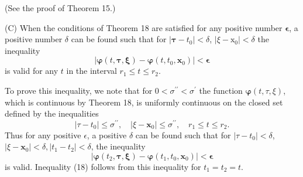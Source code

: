 \documentclass[10pt,a5paper]{book}
\theoremstyle{plain}
\theoremstyle{definition}
\theoremstyle{remark}
\begin{document}
(See the proof of Theorem 15.)

(C) When the conditions of Theorem 18 are satisfied for any positive number $\boldsymbol{\epsilon}$, a positive number $\delta$ can be found such that for $\left|\boldsymbol{\tau}-t_{0}\right|<\delta$, $\left|\xi-\mathrm{x}_{0}\right|<\delta$ the inequality
\begin{equation*}
\left|\boldsymbol{\varphi}(t, \boldsymbol{\tau}, \boldsymbol{\xi})-\boldsymbol{\varphi}\left(t, t_{0}, \mathbf{x}_{0}\right)\right|<\boldsymbol{\epsilon} \tag{18}
\end{equation*}
is valid for any $t$ in the interval $r_{1} \leq t \leq r_{2}$.

To prove this inequality, we note that for $0<\sigma^{\prime \prime}<\sigma^{\prime}$ the function $\boldsymbol{\varphi}(t, \tau, \xi)$, which is continuous by Theorem 18, is uniformly continuous on the closed set defined by the inequalities
\[
\left|\tau-t_{0}\right| \leq \sigma^{\prime \prime}, \quad\left|\xi-\mathbf{x}_{0}\right| \leq \sigma^{\prime \prime}, \quad r_{1} \leq t \leq r_{2} .
\]
Thus for any positive $\epsilon$, a positive $\delta$ can be found such that for $\left|\tau-t_{0}\right|<\delta$, $\left|\xi-\mathbf{x}_{0}\right|<\delta,\left|t_{1}-t_{2}\right|<\delta$, the inequality
\[
\left|\boldsymbol{\varphi}\left(t_{2}, \boldsymbol{\tau}, \boldsymbol{\xi}\right)-\boldsymbol{\varphi}\left(t_{1}, t_{0}, \mathbf{x}_{0}\right)\right|<\boldsymbol{\epsilon}
\]
is valid. Inequality (18) follows from this inequality for $t_{1}=t_{2}=t$.
\end{document}
